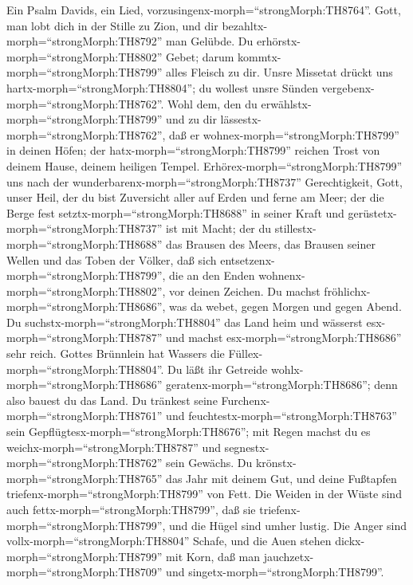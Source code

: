  Ein Psalm Davids, ein Lied,
vorzusingenx-morph=``strongMorph:TH8764''. Gott, man lobt dich in der
Stille zu Zion, und dir bezahltx-morph=``strongMorph:TH8792'' man
Gelübde.  Du erhörstx-morph=``strongMorph:TH8802'' Gebet;
darum kommtx-morph=``strongMorph:TH8799'' alles Fleisch zu dir.
 Unsre Missetat drückt uns
hartx-morph=``strongMorph:TH8804''; du wollest unsre Sünden
vergebenx-morph=``strongMorph:TH8762''.  Wohl dem, den du
erwählstx-morph=``strongMorph:TH8799'' und zu dir
lässestx-morph=``strongMorph:TH8762'', daß er
wohnex-morph=``strongMorph:TH8799'' in deinen Höfen; der
hatx-morph=``strongMorph:TH8799'' reichen Trost von deinem Hause, deinem
heiligen Tempel.  Erhörex-morph=``strongMorph:TH8799'' uns
nach der wunderbarenx-morph=``strongMorph:TH8737'' Gerechtigkeit, Gott,
unser Heil, der du bist Zuversicht aller auf Erden und ferne am Meer;
 der die Berge fest setztx-morph=``strongMorph:TH8688'' in
seiner Kraft und gerüstetx-morph=``strongMorph:TH8737'' ist mit Macht;
 der du stillestx-morph=``strongMorph:TH8688'' das Brausen
des Meers, das Brausen seiner Wellen und das Toben der Völker,
 daß sich entsetzenx-morph=``strongMorph:TH8799'', die an
den Enden wohnenx-morph=``strongMorph:TH8802'', vor deinen Zeichen. Du
machst fröhlichx-morph=``strongMorph:TH8686'', was da webet, gegen
Morgen und gegen Abend.  Du
suchstx-morph=``strongMorph:TH8804'' das Land heim und wässerst
esx-morph=``strongMorph:TH8787'' und machst
esx-morph=``strongMorph:TH8686'' sehr reich. Gottes Brünnlein hat
Wassers die Füllex-morph=``strongMorph:TH8804''. Du läßt ihr Getreide
wohlx-morph=``strongMorph:TH8686''
geratenx-morph=``strongMorph:TH8686''; denn also bauest du das Land.
 Du tränkest seine Furchenx-morph=``strongMorph:TH8761''
und feuchtestx-morph=``strongMorph:TH8763'' sein
Gepflügtesx-morph=``strongMorph:TH8676''; mit Regen machst du es
weichx-morph=``strongMorph:TH8787'' und
segnestx-morph=``strongMorph:TH8762'' sein Gewächs.  Du
krönstx-morph=``strongMorph:TH8765'' das Jahr mit deinem Gut, und deine
Fußtapfen triefenx-morph=``strongMorph:TH8799'' von Fett. 
Die Weiden in der Wüste sind auch fettx-morph=``strongMorph:TH8799'',
daß sie triefenx-morph=``strongMorph:TH8799'', und die Hügel sind umher
lustig.  Die Anger sind vollx-morph=``strongMorph:TH8804''
Schafe, und die Auen stehen dickx-morph=``strongMorph:TH8799'' mit Korn,
daß man jauchzetx-morph=``strongMorph:TH8709'' und
singetx-morph=``strongMorph:TH8799''.

